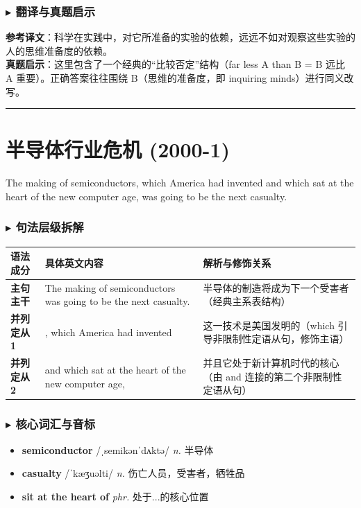 \documentclass[cn,normal,11pt]{elegantnote}
\newcommand{\retrokey}[1]{{\color{accentcolor}\textbf{#1}}}
\renewcommand{\citshape}{\kaishu\fontspec{Arial}}
\begin{document}
\subsubsection*{$\blacktriangleright$ 翻译与真题启示}
\begin{remark}
  \textbf{参考译文}：科学在实践中，对它所准备的实验的依赖，远远不如对观察这些实验的人的思维准备度的依赖。\\
  \textbf{真题启示}：这里包含了一个经典的“比较否定”结构（far less A than B = B 远比 A 重要）。正确答案往往围绕 B（思维的准备度，即 inquiring minds）进行同义改写。
\end{remark}

\par\vspace{10pt}\hrule\vspace{10pt}

\section{半导体行业危机 (2000-1)}
\begin{note}
  The making of semiconductors, which America had invented and which sat at the heart of the new computer age, was going to be the next casualty.
\end{note}

\subsubsection*{$\blacktriangleright$ 句法层级拆解}
\noindent
\begin{tabularx}{\textwidth}{p{2.8cm} X X}
  \toprule
  \textbf{语法成分} & \textbf{具体英文内容} & \textbf{解析与修饰关系} \\
  \midrule
  \textbf{主句主干} & The making of semiconductors was going to be the next casualty. & 半导体的制造将成为下一个受害者（经典主系表结构） \\
  \midrule
  \textbf{并列定从 1} & , which America had invented & 这一技术是美国发明的（which 引导非限制性定语从句，修饰主语） \\
  \midrule
  \textbf{并列定从 2} & and which sat at the heart of the new computer age, & 并且它处于新计算机时代的核心（由 and 连接的第二个非限制性定语从句） \\
  \bottomrule
\end{tabularx}

\subsubsection*{$\blacktriangleright$ 核心词汇与音标}
\begin{itemize}
  \item \retrokey{semiconductor} {\citshape /ˌsemikənˈdʌktə/} \textit{n.} 半导体
  \item \retrokey{casualty} {\citshape /ˈkæʒuəlti/} \textit{n.} 伤亡人员，受害者，牺牲品
  \item \retrokey{sit at the heart of} \textit{phr.} 处于...的核心位置
\end{itemize}
\end{document}
